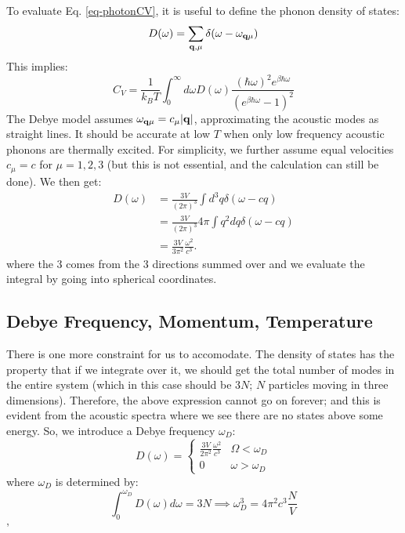 To evaluate Eq. \eqref{eq-photonCV}, it is useful to define the phonon density of states:
\begin{equation}
    D(\omega) = \sum_{\mathbf{q}, \mu} \delta(\omega - \omega_{\mathbf{q}\mu})
\end{equation}
This implies:
\begin{equation}
    C_V = \frac{1}{k_BT}\int_0^\infty d\omega D(\omega)\frac{(\hbar\omega)^2 e^{\beta\hbar\omega}}{(e^{\beta\hbar\omega} - 1)^2}
\end{equation}
The Debye model assumes $\omega_{\mathbf{q}\mu} = c_\mu\lvert \mathbf{q} \rvert$, approximating the acoustic modes as straight lines. It should be accurate at low $T$ when only low frequency acoustic phonons are thermally excited. For simplicity, we further assume equal velocities $c_\mu = c$ for $\mu = 1,2,3$ (but this is not essential, and the calculation can still be done). We then get:
\begin{equation}
    \begin{split}
        D(\omega) &= \frac{3V}{(2\pi)^3}\int d^3q \delta(\omega - cq)
        \\ &= \frac{3V}{(2\pi)^3}4\pi \int q^2 dq \delta(\omega - cq) 
        \\ &= \frac{3V}{3\pi^2}\frac{\omega^2}{c^3}.
    \end{split}
\end{equation}
where the $3$ comes from the 3 directions summed over and we evaluate the integral by going into spherical coordinates. 

\subsection{Debye Frequency, Momentum, Temperature}
There is one more constraint for us to accomodate. The density of states has the property that if we integrate over it, we should get the total number of modes in the entire system (which in this case should be $3N$; $N$ particles moving in three dimensions). Therefore, the above expression cannot go on forever; and this is evident from the acoustic spectra where we see there are no states above some energy. So, we introduce a Debye frequency $\omega_D$:
\begin{equation}
    D(\omega) = \begin{cases}
        \frac{3V}{2\pi^2}\frac{\omega^2}{c^3} & \Omega < \omega_D
        \\ 0 & \omega > \omega_D
    \end{cases}
\end{equation}
where $\omega_D$ is determined by:
\begin{equation}
    \int_0^{\omega_D}D(\omega)d\omega = 3N \implies \omega_D^3 = 4\pi^2c^3\frac{N}{V}
\end{equation}'

